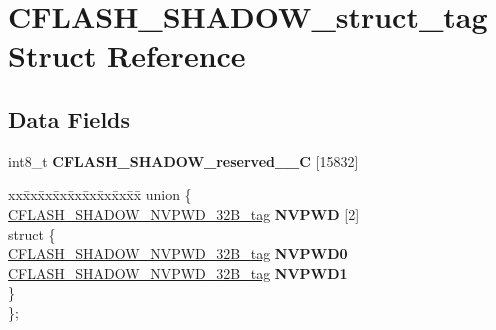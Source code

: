 \hypertarget{structCFLASH__SHADOW__struct__tag}{}\section{C\+F\+L\+A\+S\+H\+\_\+\+S\+H\+A\+D\+O\+W\+\_\+struct\+\_\+tag Struct Reference}
\label{structCFLASH__SHADOW__struct__tag}
\subsection*{Data Fields}
\begin{DoxyCompactItemize}
\item 
\mbox{\label{structCFLASH__SHADOW__struct__tag_ac9463c24816b967b52c04a36ccc6d974}} 
int8\+\_\+t {\bfseries C\+F\+L\+A\+S\+H\+\_\+\+S\+H\+A\+D\+O\+W\+\_\+reserved\+\_\+\_\+C} \mbox{[}15832\mbox{]}
\item 
\mbox{\label{structCFLASH__SHADOW__struct__tag_a91b7065324f729587d6963f1d66e73e9}} 
\begin{tabbing}
xx\=xx\=xx\=xx\=xx\=xx\=xx\=xx\=xx\=\kill
union \{\\
\>\mbox{\hyperlink{unionCFLASH__SHADOW__NVPWD__32B__tag}{CFLASH\_SHADOW\_NVPWD\_32B\_tag}} {\bfseries NVPWD} \mbox{[}2\mbox{]}\\
\mbox{\label{unionCFLASH__SHADOW__struct__tag_1_1_0D1477_a0a2a8d6f4e8cb2af9c758f6f2b42aa99}} 
\>struct \{\\
\>\>\mbox{\hyperlink{unionCFLASH__SHADOW__NVPWD__32B__tag}{CFLASH\_SHADOW\_NVPWD\_32B\_tag}} {\bfseries NVPWD0}\\
\>\>\mbox{\hyperlink{unionCFLASH__SHADOW__NVPWD__32B__tag}{CFLASH\_SHADOW\_NVPWD\_32B\_tag}} {\bfseries NVPWD1}\\
\>\} \\
\}; \\


\end{tabbing}
\end{DoxyCompactItemize}

